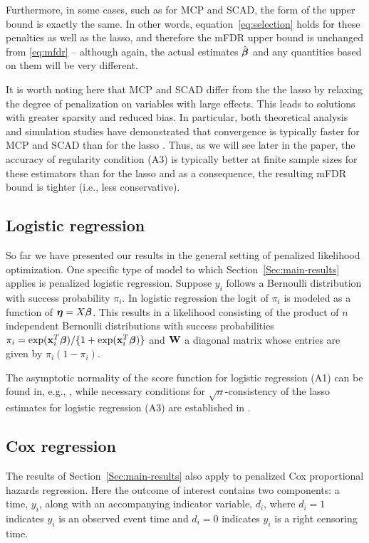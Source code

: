 Furthermore, in some cases, such as for MCP and SCAD, the form of the upper bound is exactly the same.  In other words, equation~\eqref{eq:selection} holds for these penalties as well as the lasso, and therefore the mFDR upper bound is unchanged from \eqref{eq:mfdr} -- although again, the actual estimates $\hat{\boldsymbol{\beta}}$ and any quantities based on them will be very different.

It is worth noting here that MCP and SCAD differ from the the lasso by relaxing the degree of penalization on variables with large effects.  This leads to solutions with greater sparsity and reduced bias.  In particular, both theoretical analysis and simulation studies have demonstrated that convergence is typically faster for MCP and SCAD than for the lasso \citep{MCP,SCAD,Breheny2011}.  Thus, as we will see later in the paper, the accuracy of regularity condition (A3) is typically better at finite sample sizes for these estimators than for the lasso and as a consequence, the resulting mFDR bound is tighter (i.e., less conservative).

\subsection{Logistic regression}

So far we have presented our results in the general setting of penalized likelihood optimization. One specific type of model to which Section~\ref{Sec:main-results} applies is penalized logistic regression. Suppose $y_i$ follows a Bernoulli distribution with success probability $\pi_i$. In logistic regression the logit of $\pi_i$ is modeled as a function of $\boldsymbol{\eta} = X\boldsymbol{\beta}$.  This results in a likelihood consisting of the product of $n$ independent Bernoulli distributions with success probabilities $\pi_i = \exp(\mathbf{x}_i^T\boldsymbol{\beta})/\{1 + \exp(\mathbf{x}_i^T\boldsymbol{\beta})\}$ and $\mathbf{W}$ a diagonal matrix whose entries are given by $\pi_i(1-\pi_i)$.

The asymptotic normality of the score function for logistic regression (A1) can be found in, e.g., \citet{McCullagh1989}, while necessary conditions for $\sqrt{n}$-consistency of the lasso estimates for logistic regression (A3) are established in \citet{SCAD}.

\subsection{Cox regression}
\label{Sec:cox}

The results of Section~\ref{Sec:main-results} also apply to penalized Cox proportional hazards regression. Here the outcome of interest contains two components: a time, $y_i$, along with an accompanying indicator variable, $d_i$, where $d_i = 1$ indicates $y_i$ is an observed event time and $d_i = 0$ indicates $y_i$ is a right censoring time.


